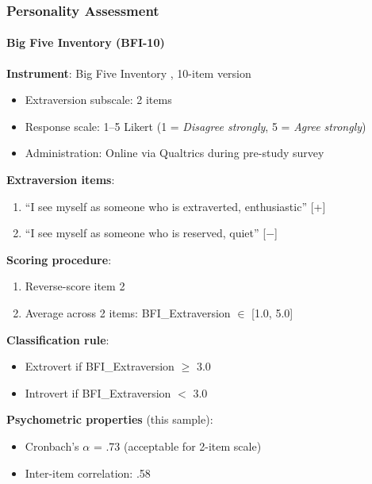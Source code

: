 \documentclass[12pt]{article}
\begin{document}
\subsubsection{Personality Assessment}

\paragraph{Big Five Inventory (BFI-10)}

\textbf{Instrument}: Big Five Inventory \citep{rammstedt2007big}, 10-item version
\begin{itemize}
    \item Extraversion subscale: 2 items
    \item Response scale: 1--5 Likert (1 = \textit{Disagree strongly}, 5 = \textit{Agree strongly})
    \item Administration: Online via Qualtrics during pre-study survey
\end{itemize}

\textbf{Extraversion items}:
\begin{enumerate}
    \item ``I see myself as someone who is extraverted, enthusiastic'' [+]
    \item ``I see myself as someone who is reserved, quiet'' [$-$]
\end{enumerate}

\textbf{Scoring procedure}:
\begin{enumerate}
    \item Reverse-score item 2
    \item Average across 2 items: BFI\_Extraversion $\in$ [1.0, 5.0]
\end{enumerate}

\textbf{Classification rule}:
\begin{itemize}
    \item Extrovert if BFI\_Extraversion $\geq$ 3.0
    \item Introvert if BFI\_Extraversion $<$ 3.0
\end{itemize}

\textbf{Psychometric properties} (this sample):
\begin{itemize}
    \item Cronbach's $\alpha$ = .73 (acceptable for 2-item scale)
    \item Inter-item correlation: .58
\end{itemize}
\end{document}

